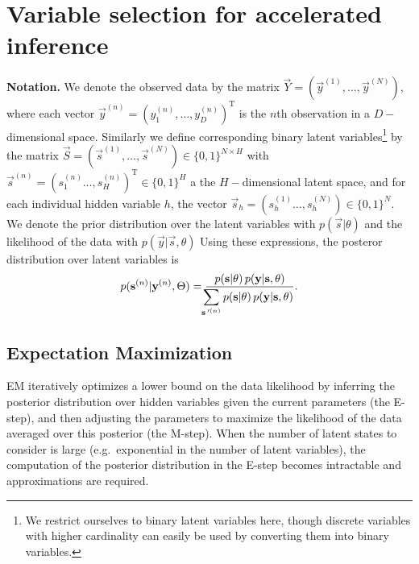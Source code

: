 \section{Variable selection for accelerated inference}
\label{method}
%
\textbf{Notation.}
We denote the observed data by the matrix $\vec{Y}=(\vec{y}^{(1)}, \dots, \vec{y}^{(N)})$, where each vector $\vec{y}^{(n)} = ( y_1^{(n)}, \dots, y_D^{(n)})^\mathrm{T}$ is the $n$th observation 
in a $D-$dimensional space.
Similarly we define corresponding 
binary latent variables\footnote{We restrict ourselves to binary latent variables here, though
discrete variables with higher cardinality can easily be used by
converting them into binary variables.} 
by the matrix $\vec{S} = (\vec{s}^{(1)}, \dots, \vec{s}^{(N)})\in \{0,1\}^{N \times H}$ with $\vec{s}^{(n)}=(s_1^{(n)}\dots, s^{(n)}_H)^\mathrm{T} \in \{0,1\}^{H}$ a the $H-$dimensional latent space,
and for each individual hidden variable $h$, the vector $\vec{s}_h=(s_h^{(1)}\dots, s^{(N)}_h)\in \{0,1\}^{N}$. 
%
We denote the prior distribution over the latent variables with $p(\vec{s} | \theta)$ 
and the likelihood of the data with $p(\vec{y} | \vec{s}, \theta)$
Using these expressions, the posteror distribution over latent variables is 
%
\vspace{-.2cm}
\begin{equation}
\label{eq:post}
p({\mathbf{s}}^{(n)}|{\mathbf{y}}^{(n)},\Theta)  = \frac{p({\mathbf{s}} | \theta) \, p({\mathbf{y}} | {\mathbf{s}}, \theta)}
{\displaystyle\hspace{-1.5mm}\sum_{{\mathbf{s}}\,'^{(n)}} p({\mathbf{s}} | \theta) \, p({\mathbf{y}} | {\mathbf{s}}, \theta)}.
\end{equation}
\subsection{Expectation Maximization}
EM iteratively optimizes a lower bound on the data likelihood by inferring the
posterior distribution over hidden variables given the current parameters (the
E-step), and then adjusting the parameters to maximize the likelihood of the
data averaged over this posterior (the M-step).
%
When the number of latent states to consider is large (e.g.\ exponential in the
number of latent variables), the computation of the posterior distribution in
the E-step becomes intractable and approximations are required.

%
%

